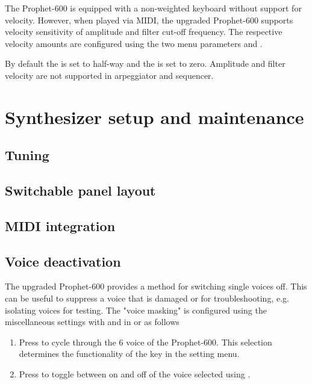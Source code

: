 \documentclass[landscape, 11pt, oneside, twoside]{report}
\newenvironment{flowtext}{\addmargin[0cm]{0cm}}{\endaddmargin} %
\begin{document}
\begin{flowtext}
The Prophet-600 is equipped with a non-weighted keyboard without support for velocity. However, when played via MIDI, the upgraded Prophet-600 supports velocity sensitivity of amplitude and filter cut-off frequency. The respective velocity amounts are configured using the two menu parameters \ampvel and \filvel.

By default the \ampvel is set to half-way and the \filvel is set to zero. Amplitude and filter velocity are not supported in arpeggiator and sequencer.

\pagebreak


\chapter{Synthesizer setup and maintenance}\label{maintenance}

\section{Tuning}\label{tuning}



\section{Switchable panel layout}\label{panelswitch}



\section{MIDI integration}\label{midiintegration}



\section{Voice deactivation}

The upgraded Prophet-600 provides a method for switching single voices off. This can be useful to suppress a voice that is damaged or for troubleshooting, e.g. isolating voices for testing. The "voice masking" is configured using the miscellaneous settings with  and  in \shiftmode or \shiftlock as follows
\begin{enumerate}
  \setlength\itemsep{0cm}
  \item Press  to cycle through the 6 voice of the Prophet-600. This selection determines the functionality of the key  in the setting menu.
  \item Press  to toggle between on and off of the voice selected using . 
\end{enumerate}


\end{flowtext}
\end{document}
